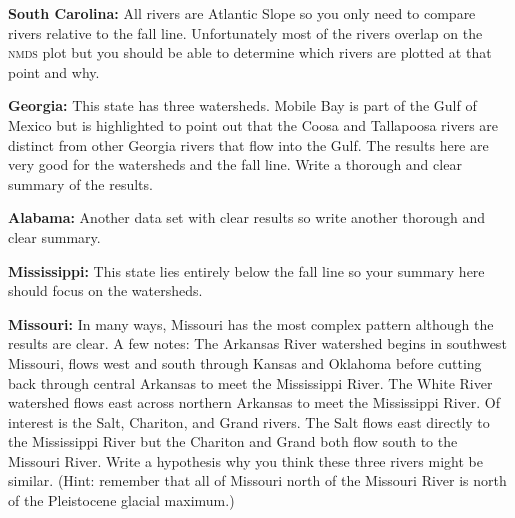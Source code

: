 \documentclass[11pt, addpoints]{exam}
\begin{document}
\begin{questions}
\question
\textbf{South Carolina:} All rivers are Atlantic Slope so you only need
to compare rivers relative to the fall line. Unfortunately most of the
rivers overlap on the \textsc{nmds} plot but you should be able to 
determine which rivers are plotted at that point and why.

\question
\textbf{Georgia:} This state has three watersheds. Mobile Bay is part of 
the Gulf of Mexico but is highlighted to point out that the Coosa and
Tallapoosa rivers are distinct from other Georgia rivers that flow into 
the Gulf. The results here are very good for the watersheds and the fall 
line. Write a thorough and clear summary of the results.

\question
\textbf{Alabama:} Another data set with clear results so write another
thorough and clear summary.

\question
\textbf{Mississippi:} This state lies entirely below the fall line so
your summary here should focus on the watersheds.

\question
\textbf{Missouri:} In many ways, Missouri has the most complex pattern
although the results are clear.  A few notes: The Arkansas River 
watershed begins in southwest Missouri, flows west and south through 
Kansas and Oklahoma before cutting back through central Arkansas to meet 
the Mississippi River. The White River watershed flows east across 
northern Arkansas to meet the Mississippi River.  Of interest is the
Salt, Chariton, and Grand rivers. The Salt flows east directly to the 
Mississippi River but the Chariton and Grand both flow south to the 
Missouri River. Write a hypothesis why you think these three rivers might
be similar. (Hint: remember that all of Missouri north of the Missouri
River is north of the Pleistocene glacial maximum.)

\end{questions}
\end{document}

